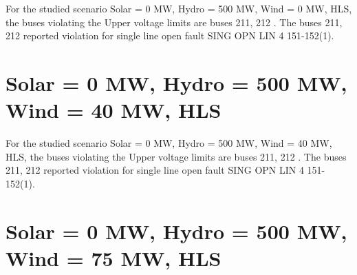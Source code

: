 \documentclass[10pt]{report}
\begin{document}
For the studied scenario Solar = 0 MW, Hydro = 500 MW, Wind = 0 MW, HLS, the buses violating the Upper voltage limits are buses 211, 212 .
The buses 211, 212 reported violation for single line open fault SING OPN LIN   4 151-152(1).
\begin{table}[H]
\caption{Contingencies reporting bus voltages greater than emergency voltage of 1.1 PU for scenario Solar = 0 MW, Hydro = 500 MW, Wind = 0 MW, HLS}
\label{HVSolar0MWHydro500MWWind0MWHLS}
\centering
{}
\end{table}

\section{Solar = 0 MW, Hydro = 500 MW, Wind = 40 MW, HLS}

For the studied scenario Solar = 0 MW, Hydro = 500 MW, Wind = 40 MW, HLS, the buses violating the Upper voltage limits are buses 211, 212 .
The buses 211, 212 reported violation for single line open fault SING OPN LIN   4 151-152(1).
\begin{table}[H]
\caption{Contingencies reporting bus voltages greater than emergency voltage of 1.1 PU for scenario Solar = 0 MW, Hydro = 500 MW, Wind = 40 MW, HLS}
\label{HVSolar0MWHydro500MWWind40MWHLS}
\centering
{}
\end{table}

\section{Solar = 0 MW, Hydro = 500 MW, Wind = 75 MW, HLS}
\end{document}
